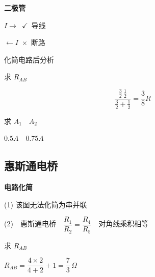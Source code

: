 


\textbf{二极管}

$I\to$\ $\checkmark$\ 导线

$\leftarrow I$\ $\times$\ 断路

化简电路后分析

\begin{problem}
求 $R_{AB}$
\begin{solution}
\[ \dfrac{\frac{3}{2}\,\frac{1}{2}}{\frac{3}{2}+\frac{1}{2}}=\dfrac{3}{8}R \]%
\end{solution}
\end{problem}

\begin{problem}
\noindent 求 $A_1$　$A_2$

\noindent $0.5\unit{A}$　$0.75\unit{A}$
\end{problem}

\subsection{惠斯通电桥}
\textbf{电路化简}

\noindent (1)
\noindent 该图无法化简为串并联

\noindent (2)　惠斯通电桥　$\dfrac{R_1}{R_2}=\dfrac{R_4}{R_5}$　对角线乘积相等

\begin{problem}
求 $R_{AB}$
\begin{solution}
$R_{AB}=\dfrac{4\times2}{4+2}+1=\dfrac{7}{3}\,\Omega$
\end{solution}
\end{problem}


